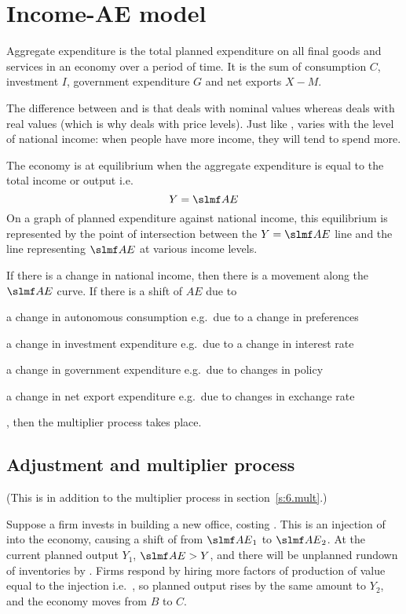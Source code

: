 \documentclass[Economics.tex]{subfiles}
\begin{document}
\section{Income-AE model}
Aggregate expenditure \AgE{} is the total planned expenditure on all final goods and services in an economy over a period of time. It is the sum of consumption \(C\), investment \(I\), government expenditure \(G\) and net exports \(X-M\).

The difference between \AgE{} and \AD{} is that \AgE{} deals with nominal values whereas \AD{} deals with real values (which is why \AD{} deals with price levels). Just like \AD{}, \AgE{} varies with the level of national income: when people have more income, they will tend to spend more.

The economy is at equilibrium when the aggregate expenditure is equal to the total income or output i.e. \[Y = \AgE\] On a graph of planned expenditure against national income, this equilibrium is represented by the point of intersection between the \(Y = \AgE\) line and the line representing \(\AgE\) at various income levels.

If there is a change in national income, then there is a movement along the \(\AgE\) curve. If there is a shift of \(AE\) due to \begin{slinenumor}
\item a change in autonomous consumption e.g.\ due to a change in preferences
\item a change in investment expenditure e.g.\ due to a change in interest rate
\item a change in government expenditure e.g.\ due to changes in policy
\item a change in net export expenditure e.g.\ due to changes in exchange rate
\end{slinenumor}, then the multiplier process takes place.
\subsection{Adjustment and multiplier process}
(This is in addition to the multiplier process in section~\ref{s:6.mult}.)

Suppose a firm invests in building a new office, costing . This is an injection of  into the economy, causing a shift of \AgE{} from \(\AgE_1\) to \(\AgE_2\). At the current planned output \(Y_1\), \(\AgE > Y\), and there will be unplanned rundown of inventories by . Firms respond by hiring more factors of production of value equal to the injection i.e.\ , so planned output rises by the same amount to \(Y_2\), and the economy moves from \(B\) to \(C\).
\end{document}
